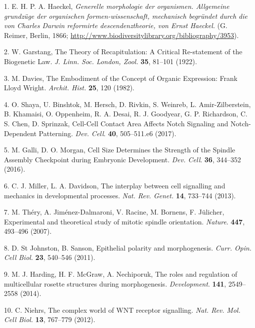 \documentclass[11pt,singlespacinge,twoside]{reedthesis} %
\begin{document}
\hypertarget{refs}{}
\leavevmode\hypertarget{ref-Haeckel1866}{}%
1. E. H. P. A. Haeckel, \emph{Generelle morphologie der organismen. Allgemeine grundzüge der organischen formen-wissenschaft, mechanisch begründet durch die von Charles Darwin reformirte descendenztheorie, von Ernst Haeckel.} (G. Reimer, Berlin, 1866; \url{http://www.biodiversitylibrary.org/bibliography/3953}).

\leavevmode\hypertarget{ref-Garstang1922}{}%
2. W. Garstang, The Theory of Recapitulation: A Critical Re-statement of the Biogenetic Law. \emph{J. Linn. Soc. London, Zool.} \textbf{35}, 81--101 (1922).

\leavevmode\hypertarget{ref-Davies1982}{}%
3. M. Davies, The Embodiment of the Concept of Organic Expression: Frank Lloyd Wright. \emph{Archit. Hist.} \textbf{25}, 120 (1982).

\leavevmode\hypertarget{ref-Shaya2017a}{}%
4. O. Shaya, U. Binshtok, M. Hersch, D. Rivkin, S. Weinreb, L. Amir-Zilberstein, B. Khamaisi, O. Oppenheim, R. A. Desai, R. J. Goodyear, G. P. Richardson, C. S. Chen, D. Sprinzak, Cell-Cell Contact Area Affects Notch Signaling and Notch-Dependent Patterning. \emph{Dev. Cell}. \textbf{40}, 505--511.e6 (2017).

\leavevmode\hypertarget{ref-Galli2016}{}%
5. M. Galli, D. O. Morgan, Cell Size Determines the Strength of the Spindle Assembly Checkpoint during Embryonic Development. \emph{Dev. Cell}. \textbf{36}, 344--352 (2016).

\leavevmode\hypertarget{ref-Miller2013}{}%
6. C. J. Miller, L. A. Davidson, The interplay between cell signalling and mechanics in developmental processes. \emph{Nat. Rev. Genet.} \textbf{14}, 733--744 (2013).

\leavevmode\hypertarget{ref-Thery2007}{}%
7. M. Théry, A. Jiménez-Dalmaroni, V. Racine, M. Bornens, F. Jülicher, Experimental and theoretical study of mitotic spindle orientation. \emph{Nature}. \textbf{447}, 493--496 (2007).

\leavevmode\hypertarget{ref-StJohnston2011}{}%
8. D. St Johnston, B. Sanson, Epithelial polarity and morphogenesis. \emph{Curr. Opin. Cell Biol.} \textbf{23}, 540--546 (2011).

\leavevmode\hypertarget{ref-Harding2014b}{}%
9. M. J. Harding, H. F. McGraw, A. Nechiporuk, The roles and regulation of multicellular rosette structures during morphogenesis. \emph{Development}. \textbf{141}, 2549--2558 (2014).

\leavevmode\hypertarget{ref-Niehrs2012}{}%
10. C. Niehrs, The complex world of WNT receptor signalling. \emph{Nat. Rev. Mol. Cell Biol.} \textbf{13}, 767--779 (2012).
\end{document}
